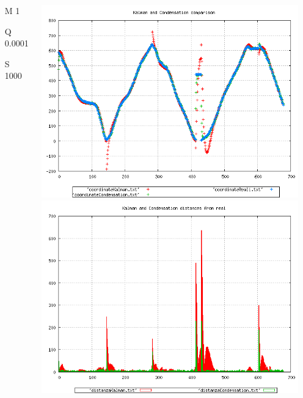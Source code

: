 \documentclass{beamer}
\begin{document}
{\begin{columns}
\begin{scriptsize}
\begin{itemize}
\item [M]1
\item [Q]0.0001
\item [S]1000
\end{itemize}
\end{scriptsize}
\includegraphics[scale=0.1]{../esperimenti/single_car/mod_1-Q_0.0001-S_1000/plot.png}\\
\includegraphics[scale=0.1]{../esperimenti/single_car/mod_1-Q_0.0001-S_1000/plot-distances.png}
\end{columns}
}
\end{document}
